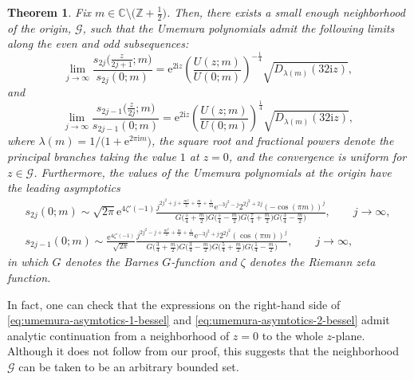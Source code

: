 \documentclass[pdftex]{sigma}
\numberwithin{equation}{section}
\newtheorem{Theorem}{Theorem}[section]
\newcommand{\ee}{\mathrm{e}}
\newcommand{\ii}{\mathrm{i}}
\newcommand{\C}{{\mathbb{C}}}
\newcommand{\Z}{{\mathbb{Z}}}
\newcommand\lb{\left(}
\newcommand\rb{\right)}
\begin{document}
\begin{Theorem}\label{thm:umemura_asym}
Fix $m \in \C \setminus \big(\Z + \frac{1}{2}\big)$. Then, there exists a small enough neighborhood of the origin, $\mathcal{G}$, such that the Umemura polynomials admit the following limits along the even and odd subsequences:
\begin{equation}
 \lim_{j\to\infty}\frac{s_{2j}\big( \frac{z}{2j+1};m \big)}{s_{2j}(0;m)}=\ee^{2\ii z}\left(\frac{U(z;m)}{U(0;m)}\right)^{-\frac{1}{4}} \sqrt{D_{\lambda(m)}\lb 32\ii z\rb},
\label{eq:umemura-asymtotics-1-bessel}
\end{equation}
and
\begin{equation}
 \lim_{j\to\infty}\frac{s_{2j-1} \big(\frac{z}{2j} ;m\big)}{s_{2j-1}(0;m)}=\ee^{2\ii z}\left(\frac{U(z;m)}{U(0;m)}\right)^{\frac{1}{4}} \sqrt{D_{\lambda(m)}\lb 32\ii z\rb},
\label{eq:umemura-asymtotics-2-bessel}
\end{equation}
where $\lambda(m)=1/\big(1+\ee^{2\pi \ii m}\big)$, the square root and fractional powers denote the principal branches taking the value $1$ at $z=0$, and the convergence is uniform for $z\in\mathcal{G}$. Furthermore,
the values of the Umemura polynomials at the origin have the leading asymptotics
\begin{gather}
 s_{2j}(0;m)\sim\sqrt{2\pi}\ee^{4\zeta'(-1)}\frac{j^{2j^2+j+\frac{m^2}{2}+\frac{m}{2}+\frac{1}{24}}\ee^{-3j^2-j}2^{2j^2+2j}(-\cos(\pi m))^j}{G\big(\frac{5}{4}+\frac{m}{2}\big)G\big(\frac{5}{4}-\frac{m}{2}\big)G\big(\frac{7}{4}+\frac{m}{2}\big)G\big(\frac{3}{4}-\frac{m}{2}\big)},\qquad j\to\infty,\label{eq:umemura-zero-asym-even}
\\
 s_{2j-1}(0;m)\sim\frac{\ee^{4\zeta'(-1)}}{\sqrt{2\pi}}\frac{j^{2j^2-j+\frac{m^2}{2}+\frac{m}{2}+\frac{1}{24}}\ee^{-3j^2+j}2^{2j^2}(\cos(\pi m))^j}{G\big(\frac{3}{4}+\frac{m}{2}\big)G\big(\frac{3}{4}-\frac{m}{2}\big)G\big(\frac{5}{4}+\frac{m}{2}\big)G\big(\frac{1}{4}-\frac{m}{2}\big)},\qquad j\to\infty,\label{eq:umemura-zero-asym-odd}
\end{gather}
in which $G$ denotes the Barnes $G$-function and $\zeta$ denotes the Riemann zeta function.
\end{Theorem}
In fact, one can check that the expressions on the right-hand side of \eqref{eq:umemura-asymtotics-1-bessel} and \eqref{eq:umemura-asymtotics-2-bessel} admit analytic continuation from a neighborhood of $z=0$ to the whole $z$-plane. Although it does not follow from our proof, this suggests that the neighborhood $\mathcal{G}$ can be taken to be an arbitrary bounded set.
\end{document}
